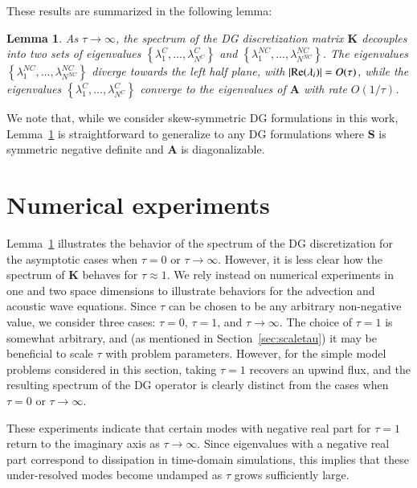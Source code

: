 \documentclass[preprint,10pt]{elsarticle}
\newcommand{\LRb}[1]{\left| #1 \right|}
\newcommand{\LRc}[1]{\left\{ #1 \right\}}
\newtheorem{lemma}[theorem]{Lemma}
\newcommand{\note}[1]{{\color{blue}#1}}
\begin{document}
These results are summarized in the following lemma:
\begin{lemma}
As $\tau \rightarrow \infty$, the spectrum of the DG discretization matrix $\bm{K}$ decouples into two sets of eigenvalues $\LRc{\lambda^C_1,\ldots,\lambda^C_{N^C}}$ and $\LRc{\lambda^{NC}_1,\ldots,\lambda^{NC}_{N^{NC}}}$.  The eigenvalues $\LRc{\lambda^{NC}_1,\ldots,\lambda^{NC}_{N^{NC}}}$ diverge towards the left half plane, with $\LRb{{\rm Re}(\lambda_i)} = O(\tau)$, while  the eigenvalues $\LRc{\lambda^C_1,\ldots,\lambda^C_{N^C}}$ converge to the eigenvalues of $\bm{A}$ with rate $O(1/\tau)$.  
\label{lemma:eig}
\end{lemma}
We note that, while we consider skew-symmetric DG formulations in this work, Lemma~\ref{lemma:eig} is straightforward to generalize to any DG formulations where $\bm{S}$ is symmetric negative definite and $\bm{A}$ is diagonalizable.%


\section{Numerical experiments}

Lemma~\ref{lemma:eig} illustrates the behavior of the \note{spectrum} of the DG discretization for the asymptotic cases when $\tau = 0$ or $\tau \rightarrow \infty$.  However, it is less clear how the \note{spectrum} of $\bm{K}$ behaves for $\tau \approx 1$.  We rely instead on numerical experiments in one and two space dimensions to illustrate behaviors for the advection and acoustic wave equations.  {\note{Since $\tau$ can be chosen to be any arbitrary non-negative value, we consider three cases: $\tau = 0$, $\tau = 1$, and $\tau \rightarrow \infty$.  The choice of $\tau = 1$ is somewhat arbitrary, and (as mentioned in Section~\ref{sec:scaletau}) it may be beneficial to scale $\tau$ with problem parameters.  However, for the simple model problems considered in this section, taking $\tau = 1$ recovers an upwind flux, and the resulting spectrum of the DG operator is clearly distinct from the cases when $\tau = 0$ or $\tau \rightarrow \infty$.}  }

These experiments indicate that certain modes with negative real part for $\tau = 1$ return to the imaginary axis as $\tau \rightarrow \infty$.  Since eigenvalues with a negative real part correspond to dissipation in time-domain simulations, this implies that these under-resolved modes become undamped as $\tau$ grows sufficiently large.  
\end{document}
